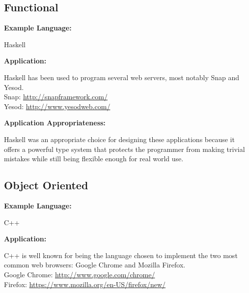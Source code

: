 \documentclass[12pt]{article}
\begin{document}
\subsection{Functional}
\begin{addmargin}[1cm]{0em}
\textbf{Example Language:}
	\begin{addmargin}[1cm]{0em}
		Haskell
	\end{addmargin}
\end{addmargin}

\begin{addmargin}[1cm]{0em}
\textbf{Application:}
	\begin{addmargin}[1cm]{0em}
		Haskell has been used to program several web servers, most notably Snap and Yesod.\\
		Snap: \url{http://snapframework.com/}\\
		Yesod: \url{http://www.yesodweb.com/}
	\end{addmargin}
\end{addmargin}

\begin{addmargin}[1cm]{0em}
\textbf{Application Appropriateness:}
	\begin{addmargin}[1cm]{0em}
		Haskell was an appropriate choice for designing these applications because it offers a powerful type system that protects the programmer from making trivial mistakes while still being flexible enough for real world use.
	\end{addmargin}
\end{addmargin}

\newpage
\subsection{Object Oriented}
\begin{addmargin}[1cm]{0em}
\textbf{Example Language:}
	\begin{addmargin}[1cm]{0em}
		C++
	\end{addmargin}
\end{addmargin}

\begin{addmargin}[1cm]{0em}
\textbf{Application:}
	\begin{addmargin}[1cm]{0em}
		C++ is well known for being the language chosen to implement the two most common web browsers: Google Chrome and Mozilla Firefox.\\
		Google Chrome: \url{http://www.google.com/chrome/}\\
		Firefox: \url{https://www.mozilla.org/en-US/firefox/new/}\\
	\end{addmargin}
\end{addmargin}
\end{document}
